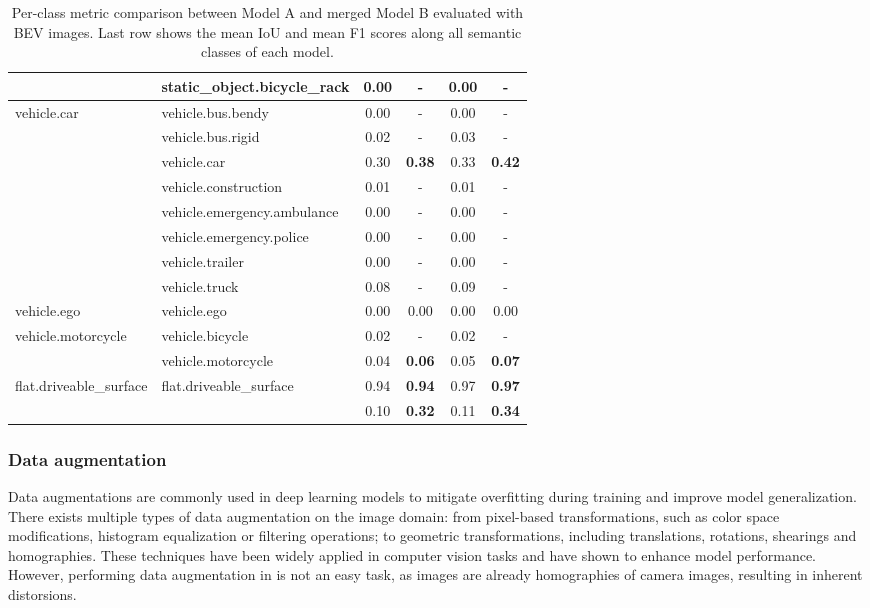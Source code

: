 \begin{table}[ht]
\begin{tabular}{llcccc}
     & static\_object.bicycle\_rack & 0.00 & - & 0.00 & - \\
    \midrule
    vehicle.car & vehicle.bus.bendy & 0.00 & - & 0.00 & - \\
     & vehicle.bus.rigid & 0.02 & - & 0.03 & - \\
     & vehicle.car & 0.30 & \textbf{0.38} & 0.33 & \textbf{0.42} \\
     & vehicle.construction & 0.01 & - & 0.01 & - \\
     & vehicle.emergency.ambulance & 0.00 & - & 0.00 & - \\
     & vehicle.emergency.police & 0.00 & - & 0.00 & - \\
     & vehicle.trailer & 0.00 & - & 0.00 & - \\
     & vehicle.truck & 0.08 & - & 0.09 & - \\
    \midrule
    vehicle.ego & vehicle.ego & 0.00 & 0.00 & 0.00 & 0.00 \\
    \midrule
    vehicle.motorcycle & vehicle.bicycle & 0.02 & - & 0.02 & - \\
     & vehicle.motorcycle & 0.04 & \textbf{0.06} & 0.05 & \textbf{0.07} \\
    \midrule
    flat.driveable\_surface & flat.driveable\_surface & 0.94 & \textbf{0.94} & 0.97 & \textbf{0.97} \\
    \bottomrule
     & & 0.10 & \textbf{0.32} & 0.11 & \textbf{0.34} \\
    \bottomrule
    \end{tabular}
    \caption{Per-class metric comparison between Model A and merged Model B evaluated with BEV images. Last row shows the mean IoU and mean F1 scores along all semantic classes of each model.}
    \label{tab:merging_comparison_bev}
\end{table}



\subsubsection{Data augmentation} \label{sec:data_augmentation}
Data augmentations are commonly used in deep learning models to mitigate overfitting during training and improve model generalization. There exists multiple types of data augmentation on the image domain: from pixel-based transformations, such as color space modifications, histogram equalization or filtering operations; to geometric transformations, including translations, rotations, shearings and homographies. These techniques have been widely applied in computer vision tasks and have shown to enhance model performance. However, performing data augmentation in  is not an easy task, as  images are already homographies of camera images, resulting in inherent distorsions.

